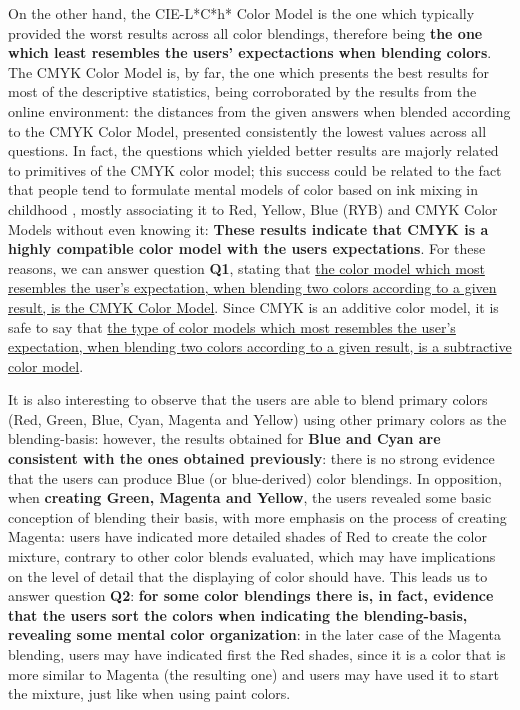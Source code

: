 %
On the other hand, the CIE-L*C*h* Color Model is the one which typically provided the worst results across all color blendings, therefore being \textbf{the one which least resembles the users' expectactions when blending colors}. The CMYK Color Model is, by far, the one
which presents the best results for most of the descriptive statistics, being corroborated by the results from the online environment: the distances from the given answers when blended according to the CMYK Color Model, presented consistently the lowest values across
all questions. In fact, the questions which yielded better results are majorly related to primitives of the CMYK color model; this success could be related to the fact that people tend to formulate mental models of color based on ink mixing in childhood
\cite{Gossett2004}, mostly associating it to Red, Yellow, Blue (RYB) and CMYK Color Models without even knowing it: \textbf{These results indicate that CMYK is a highly compatible color model with the users expectations}. For these reasons, we can answer question
\textbf{Q1}, stating that \ul{the color model which most resembles the user's expectation, when blending two colors according to a given result, is the CMYK Color Model}. Since CMYK is an additive color model, it is safe to say that \ul{the type of color models which
most resembles the user's expectation, when blending two colors according to a given result, is a subtractive color model}. \par
%
It is also interesting to observe that the users are able to blend primary colors (Red, Green, Blue, Cyan, Magenta and Yellow) using other primary colors as the blending-basis: however, the results obtained for \textbf{Blue and Cyan are consistent with the ones
obtained previously}: there is no strong evidence that the users can produce Blue (or blue-derived) color blendings. In opposition, when \textbf{creating Green, Magenta and Yellow}, the users revealed some basic conception of blending their basis, with more emphasis
on the process of creating Magenta: users have indicated more detailed shades of Red to create the color mixture, contrary to other color blends evaluated, which may have implications on the level of detail that the displaying of color should have. This leads us to
answer question \textbf{Q2}: \textbf{for some color blendings there is, in fact, evidence that the users sort the colors when indicating the blending-basis, revealing some mental color organization}: in the later case of the Magenta blending, users may have indicated
first the Red shades, since it is a color that is more similar to Magenta (the resulting one) and users may have used it to start the mixture, just like when using paint colors. \par
